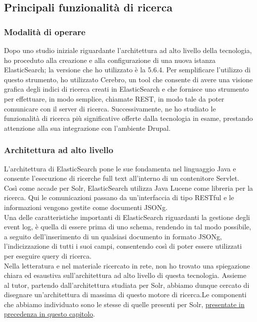 		\subsection{Principali funzionalità di ricerca}
		
			\subsubsection{Modalità di operare}
			Dopo uno studio iniziale riguardante l'architettura ad alto livello della tecnologia, ho proceduto alla creazione e alla configurazione di una nuova istanza \gls{ElasticSearch}; la versione che ho utilizzato è la 5.6.4. Per semplificare l'utilizzo di questo strumento, ho utilizzato \gls{Cerebro}, un tool che consente di avere una visione grafica degli indici di ricerca creati in \gls{ElasticSearch} e che fornisce uno strumento per effettuare, in modo semplice, chiamate \gls{REST}, in modo tale da poter comunicare con il server di ricerca.
			Successivamente, ne ho studiato le funzionalità di ricerca più significative offerte dalla tecnologia in esame, prestando attenzione alla sua integrazione con l'ambiente \gls{Drupal}.
			
			\subsubsection{Architettura ad alto livello}
			L'architettura di \gls{ElasticSearch} pone le sue fondamenta nel linguaggio \gls{Java} e consente l'esecuzione di ricerche full text all'interno di un contenitore \gls{Servlet}. Così come accade per \gls{Solr}, \gls{ElasticSearch} utilizza \gls{Java Lucene} come libreria per la ricerca. Qui le comunicazioni passano da un'interfaccia di tipo \gls{RESTful} e le informazioni vengono gestite come documenti \gls{JSONg}.\\
			Una delle caratteristiche importanti di \gls{ElasticSearch} riguardanti la gestione degli event log, è quella di essere prima di uno schema, rendendo in tal modo possibile, a seguito dell'inserimento di un qualsiasi documento in formato \gls{JSONg}, l'indicizzazione di tutti i suoi campi, consentendo così di poter essere utilizzati per eseguire query di ricerca. \\
			Nella letteratura e nel materiale ricercato in rete, non ho trovato una spiegazione chiara ed esaustiva sull'architettura ad alto livello di questa tecnologia. Assieme al tutor, partendo dall'architettura studiata per \gls{Solr}, abbiamo dunque cercato di disegnare un'architettura di massima di questo motore di ricerca.Le componenti che abbiamo individuato sono le stesse di quelle presenti per \gls{Solr}, \hyperref[solr:architettura_ad_alto_livello]{presentate in precedenza in questo capitolo}.

